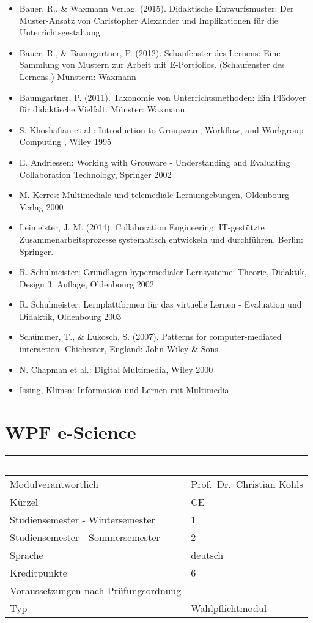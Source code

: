 \begin{itemize}
\item
  Bauer, R., \& Waxmann Verlag. (2015). Didaktische Entwurfsmuster: Der
  Muster-Ansatz von Christopher Alexander und Implikationen für die
  Unterrichtsgestaltung.
\item
  Bauer, R., \& Baumgartner, P. (2012). Schaufenster des Lernens: Eine
  Sammlung von Mustern zur Arbeit mit E-Portfolios. (Schaufenster des
  Lernens.) Münstern: Waxmann
\item
  Baumgartner, P. (2011). Taxonomie von Unterrichtsmethoden: Ein
  Plädoyer für didaktische Vielfalt. Münster: Waxmann.
\item
  S. Khoshafian et al.: Introduction to Groupware, Workflow, and
  Workgroup Computing , Wiley 1995
\item
  E. Andriessen: Working with Grouware - Understanding and Evaluating
  Collaboration Technology, Springer 2002
\item
  M. Kerres: Multimediale und telemediale Lernumgebungen, Oldenbourg
  Verlag 2000
\item
  Leimeister, J. M. (2014). Collaboration Engineering: IT-gestützte
  Zusammenarbeitsprozesse systematisch entwickeln und durchführen.
  Berlin: Springer.
\item
  R. Schulmeister: Grundlagen hypermedialer Lernsysteme: Theorie,
  Didaktik, Design 3. Auflage, Oldenbourg 2002
\item
  R. Schulmeister: Lernplattformen für das virtuelle Lernen - Evaluation
  und Didaktik, Oldenbourg 2003
\item
  Schümmer, T., \& Lukosch, S. (2007). Patterns for computer-mediated
  interaction. Chichester, England: John Wiley \& Sons.
\item
  N. Chapman et al.: Digital Multimedia, Wiley 2000
\item
  Issing, Klimsa: Information und Lernen mit Multimedia
\end{itemize}

\chapter{WPF e-Science}\label{wpf-e-science}

\begin{longtable}[]{@{}ll@{}}
\toprule
~ & ~\tabularnewline
\midrule
\endhead
Modulverantwortlich & Prof.~Dr.~Christian Kohls\tabularnewline
Kürzel & CE\tabularnewline
Studiensemester - Wintersemester & 1\tabularnewline
Studiensemester - Sommersemester & 2\tabularnewline
Sprache & deutsch\tabularnewline
Kreditpunkte & 6\tabularnewline
Voraussetzungen nach Prüfungsordnung &\tabularnewline
Typ & Wahlpflichtmodul\tabularnewline
\bottomrule
\end{longtable}

